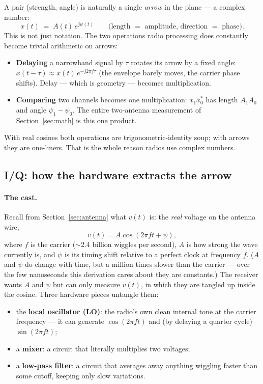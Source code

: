 A pair (strength, angle) is naturally a single \emph{arrow} in the plane ---
a complex number:
\[
x(t) \;=\; A(t)\, e^{j\psi(t)}
\qquad\text{(length $=$ amplitude, direction $=$ phase).}
\]
This is not just notation. The two operations radio processing does
constantly become trivial arithmetic on arrows:
\begin{itemize}
  \item \textbf{Delaying} a narrowband signal by $\tau$ rotates its arrow by
        a fixed angle: $x(t-\tau) \approx x(t)\,e^{-j2\pi f \tau}$
        (the envelope barely moves, the carrier phase shifts). Delay ---
        which is geometry --- becomes multiplication.
  \item \textbf{Comparing} two channels becomes one multiplication:
        $x_1 x_0^{*}$ has length $A_1 A_0$ and angle $\psi_1 - \psi_0$. The
        entire two-antenna measurement of Section~\ref{sec:math} is this one
        product.
\end{itemize}
With real cosines both operations are trigonometric-identity soup; with
arrows they are one-liners. That is the whole reason radios use complex
numbers.

\subsection{I/Q: how the hardware extracts the arrow}
\label{sec:iq-demod}

\paragraph{The cast.}
Recall from Section~\ref{sec:antenna} what $v(t)$ is: the \emph{real} voltage
on the antenna wire,
\[
v(t) = A\cos(2\pi f t + \psi),
\]
where $f$ is the carrier ($\sim$2.4 billion wiggles per second), $A$ is how
strong the wave currently is, and $\psi$ is its timing shift relative to a
perfect clock at frequency $f$. ($A$ and $\psi$ do change with time, but a
million times slower than the carrier --- over the few nanoseconds this
derivation cares about they are constants.) The receiver wants $A$ and $\psi$
but can only measure $v(t)$, in which they are tangled up inside the cosine.
Three hardware pieces untangle them:
\begin{itemize}
  \item the \textbf{local oscillator (LO)}: the radio's own clean internal
        tone at the carrier frequency --- it can generate $\cos(2\pi f t)$ and
        (by delaying a quarter cycle) $\sin(2\pi f t)$;
  \item a \textbf{mixer}: a circuit that literally multiplies two voltages;
  \item a \textbf{low-pass filter}: a circuit that averages away anything
        wiggling faster than some cutoff, keeping only slow variations.
\end{itemize}

